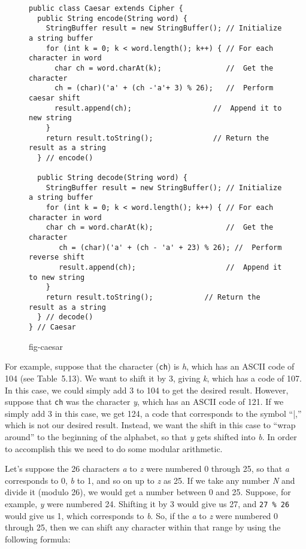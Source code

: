 \begin{figure}[h]
\jjjprogstart
\begin{jjjlisting}[35pc]
\begin{lstlisting}
public class Caesar extends Cipher {
  public String encode(String word) {
    StringBuffer result = new StringBuffer(); // Initialize a string buffer
    for (int k = 0; k < word.length(); k++) { // For each character in word
      char ch = word.charAt(k);               //  Get the character
      ch = (char)('a' + (ch -'a'+ 3) % 26);   //  Perform caesar shift
      result.append(ch);                   //  Append it to new string
    }
    return result.toString();              // Return the result as a string
  } // encode()

  public String decode(String word) {
    StringBuffer result = new StringBuffer(); // Initialize a string buffer
    for (int k = 0; k < word.length(); k++) { // For each character in word
    char ch = word.charAt(k);                 //  Get the character
       ch = (char)('a' + (ch - 'a' + 23) % 26); //  Perform reverse shift
       result.append(ch);                     //  Append it to new string
    }
    return result.toString();            // Return the result as a string
  } // decode()
} // Caesar
\end{lstlisting}
\end{jjjlisting}
{fig-caesar}
\end{figure}

For example, suppose that the character ({\tt ch}) is {\it h}, which has
an ASCII code of 104 (see Table~5.13). We want to shift it
by 3, giving {\it k}, which has a code of 107. In this case, we could
simply add 3 to 104 to get the desired result.  However, suppose
that {\tt ch} was the character {\it y}, which has an ASCII code of
121. If we simply add 3 in this case, we get 124, a code that
corresponds to the symbol ``|,'' which is not our desired result.
Instead, we want the shift in this case to ``wrap around'' to the
beginning of the alphabet, so that {\it y} gets shifted into {\it b}.
In order to accomplish this we need to do some modular arithmetic.

Let's suppose the 26 characters {\it a} to {\it z} were numbered 0 through 25,
so that {\it a} corresponds to 0, {\it b} to 1, and so on up to {\it z} as 25.  If
we take any number {\it N} and divide it (modulo 26), we would get a
number between 0 and 25. Suppose, for example, {\it y} were numbered
24. Shifting it by 3 would give us 27, and {\tt 27 \% 26} would
give us 1, which corresponds to {\it b}. So, if the {\it a} to {\it z} were
numbered 0 through 25, then we can shift any character within that
range by using the following formula:

